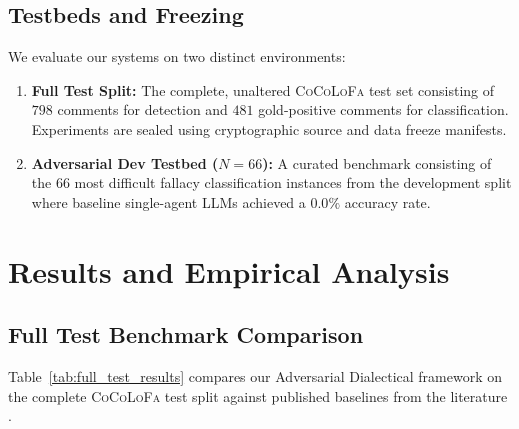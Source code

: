 \documentclass[11pt]{article}
\begin{document}
\subsection{Testbeds and Freezing}
We evaluate our systems on two distinct environments:
\begin{enumerate}[leftmargin=*,itemsep=1pt,topsep=2pt]
    \item \textbf{Full Test Split:} The complete, unaltered \textsc{CoCoLoFa} test set consisting of $798$ comments for detection and $481$ gold-positive comments for classification. Experiments are sealed using cryptographic source and data freeze manifests.
    \item \textbf{Adversarial Dev Testbed ($N=66$):} A curated benchmark consisting of the $66$ most difficult fallacy classification instances from the development split where baseline single-agent LLMs achieved a $0.0\%$ accuracy rate.
\end{enumerate}

\section{Results and Empirical Analysis}

\subsection{Full Test Benchmark Comparison}
Table~\ref{tab:full_test_results} compares our Adversarial Dialectical framework on the complete \textsc{CoCoLoFa} test split against published baselines from the literature \cite{cocolofa2024}.
\end{document}
